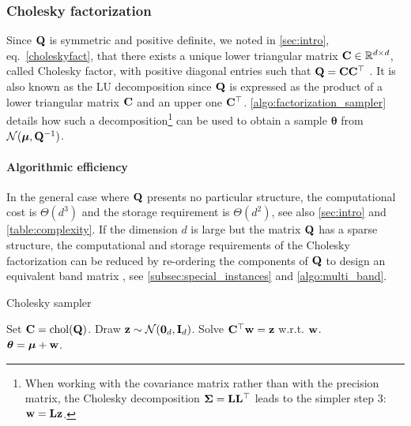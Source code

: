 \documentclass[nohypdvips,onefignum,onetabnum]{siamart171218}
\begin{document}
\subsubsection{Cholesky factorization}
\label{subsubsec:cholesky}

Since $\mathbf{Q}$ is symmetric and positive definite, we noted in \cref{sec:intro}, eq.~\eqref{choleskyfact}, that there exists a unique lower triangular matrix $\mathbf{C} \in \mathbb{R}^{d \times d}$, called Cholesky factor, with positive diagonal entries such that $\mathbf{Q} = \mathbf{C}\mathbf{C}^{\top}$ \cite{Golub1989}.
It is also known as the LU decomposition since $\mathbf{Q}$ is expressed as the product of a lower triangular matrix $\mathbf{C}$ and an upper one $\mathbf{C}^{\top}$. 
\cref{algo:factorization_sampler} details how such a decomposition\footnote{When working with the covariance matrix rather than with the precision matrix, the Cholesky decomposition $\mathbf{\Sigma}=\mathbf{L}\mathbf{L}^{\top}$ leads to the simpler step 3: $\mathbf{w}= \mathbf{Lz}$.} can be used to obtain a sample $\boldsymbol{\theta}$ from $\mathcal{N}(\boldsymbol{\mu},\mathbf{Q}^{-1})$.
\paragraph{Algorithmic efficiency}
In the general case where $\mathbf{Q}$ presents no particular structure, the computational cost is $\Theta(d^3)$ and the storage requirement is $\Theta(d^2)$, see also \cref{sec:intro} and \cref{table:complexity}.
If the dimension $d$ is large but the matrix $\mathbf{Q}$ has a sparse structure, the computational and storage requirements of the Cholesky factorization can be reduced by re-ordering the components of $\mathbf{Q}$ to design an equivalent band matrix \cite{Rue2001}, see \cref{subsec:special_instances} and \cref{algo:multi_band}.

\begin{algorithm}
\caption{Cholesky sampler}
\label{algo:factorization_sampler}
\begin{algorithmic}[1]
\State Set $\mathbf{C} = \mathrm{chol}(\mathbf{Q})$.
\State Draw $\mathbf{z} \sim \mathcal{N}(\mathbf{0}_d,\mathbf{I}_d)$.
\State Solve $\mathbf{C}^{\top}\mathbf{w} = \mathbf{z}$ w.r.t. $\mathbf{w}$.\\
\Return $\boldsymbol{\theta} = \boldsymbol{\mu} + \mathbf{w}$.
\end{algorithmic}
\end{algorithm}
\end{document}
